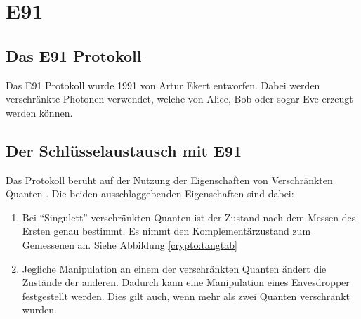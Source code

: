 \section{E91}
  \subsection{Das E91 Protokoll}
  Das E91 Protokoll wurde 1991 von Artur Ekert entworfen.
  Dabei werden verschr\"ankte Photonen verwendet, welche von Alice, Bob oder sogar Eve erzeugt werden k\"onnen.

  \subsection{Der Schl\"usselaustausch mit E91}
  Das Protokoll beruht auf der Nutzung der Eigenschaften von Verschr\"ankten Quanten \cite{qc:verschraenkung}.
  Die beiden ausschlaggebenden Eigenschaften sind dabei:

  \begin{enumerate}
      \item Bei ``Singulett'' verschr\"ankten Quanten ist der Zustand nach dem Messen des Ersten genau bestimmt.
        Es nimmt den Komplement\"arzustand zum Gemessenen an.
        Siehe Abbildung \ref{crypto:tangtab}
      \item Jegliche Manipulation an einem der verschr\"ankten Quanten \"andert die Zust\"ande der anderen.
        Dadurch kann eine Manipulation eines Eavesdropper festgestellt werden.
        Dies gilt auch, wenn mehr als zwei Quanten verschr\"ankt wurden.
  \end{enumerate}


